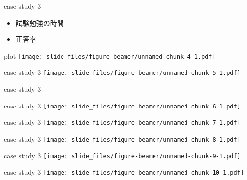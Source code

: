 \documentclass[
  ignorenonframetext,
]{beamer}
\begin{document}
\begin{frame}{case study 3}
\protect\hypertarget{case-study-3-1}{}
\Huge

\begin{itemize}
\item[\textbullet] 試験勉強の時間
\item[\textbullet] 正答率
\end{itemize}
\pause
\vspace*{-55pt}
\end{frame}

\begin{frame}{plot}
\protect\hypertarget{plot}{}
\texttt{[image: slide\_files/figure-beamer/unnamed-chunk-4-1.pdf]}
\end{frame}

\begin{frame}{case study 3}
\protect\hypertarget{case-study-3-2}{}
\texttt{[image: slide\_files/figure-beamer/unnamed-chunk-5-1.pdf]}
\end{frame}

\begin{frame}{case study 3}
\protect\hypertarget{case-study-3-3}{}
\end{frame}

\begin{frame}{case study 3}
\protect\hypertarget{case-study-3-4}{}
\texttt{[image: slide\_files/figure-beamer/unnamed-chunk-6-1.pdf]}
\end{frame}

\begin{frame}{case study 3}
\protect\hypertarget{case-study-3-5}{}
\texttt{[image: slide\_files/figure-beamer/unnamed-chunk-7-1.pdf]}
\end{frame}

\begin{frame}{case study 3}
\protect\hypertarget{case-study-3-6}{}
\texttt{[image: slide\_files/figure-beamer/unnamed-chunk-8-1.pdf]}
\end{frame}

\begin{frame}{case study 3}
\protect\hypertarget{case-study-3-7}{}
\texttt{[image: slide\_files/figure-beamer/unnamed-chunk-9-1.pdf]}
\end{frame}

\begin{frame}{case study 3}
\protect\hypertarget{case-study-3-8}{}
\texttt{[image: slide\_files/figure-beamer/unnamed-chunk-10-1.pdf]}
\end{frame}
\end{document}
